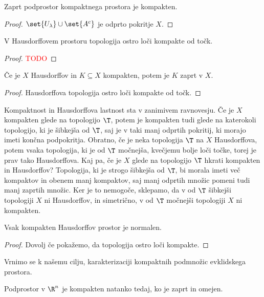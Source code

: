 \begin{trditev}
    Zaprt podprostor kompaktnega prostora je kompakten.
\end{trditev}

\begin{proof}
    $\set{U_\lambda} \cup \set{A^c}$ je odprto pokritje $X$.
\end{proof}

\begin{trditev}
    V Hausdorffovem prostoru topologija ostro loči kompakte od točk.
\end{trditev}

\begin{proof}
    \textcolor{red}{TODO}
\end{proof}

\begin{trditev}
    Če je $X$ Hausdorffov in $K \subseteq X$ kompakten, potem je $K$ zaprt v $X$.
\end{trditev}

\begin{proof}
    Hausdorffova topologija ostro loči kompakte od točk.
\end{proof}

Kompaktnost in Hausdorffova lastnost sta v zanimivem ravnovesju. Če je $X$ kompakten glede na topologijo \(\T\), potem je kompakten tudi glede na katerokoli topologijo, ki je šibkejša od \(\T\), saj je v taki manj odprtih pokritij, ki morajo imeti končna podpokritja. Obratno, če je neka topologija \(\T\) na \(X\) Hausdorffova, potem vsaka topologija, ki je od \(\T\) močnejša, kvečjemu bolje loči točke, torej je prav tako Hausdorffova. Kaj pa, če je $X$ glede na topologijo \(\T\) hkrati kompakten in Hausdorffov? Topologija, ki je strogo šibkejša od \(\T\), bi morala imeti več kompaktov in obenem manj kompaktov, saj manj odprtih množic pomeni tudi manj zaprtih množic. Ker je to nemogoče, sklepamo, da v od \(\T\) šibkejši topologiji $X$ ni Hausdorffov, in simetrično, v od \(\T\) močnejši topologiji $X$ ni kompakten.

\begin{posledica}
    Vsak kompakten Hausdorffov prostor je normalen.
\end{posledica}

\begin{proof}
    Dovolj če pokažemo, da topologija ostro loči kompakte.
\end{proof}

Vrnimo se k našemu cilju, karakterizaciji kompaktnih podmnožic evklidskega prostora.
\begin{izrek}
    Podprostor v $\R^n$ je kompakten natanko tedaj, ko je zaprt in omejen.
\end{izrek}


